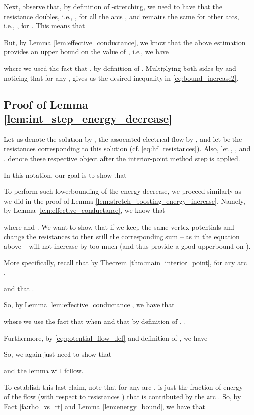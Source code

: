 \documentclass[11pt, letterpaper]{article}
\begin{document}
Next, observe that, by definition of -stretching, we need to have that the resistance doubles, i.e., , for all the arcs , and remains the same for other arcs, i.e., , for .  
This means that



But, by Lemma \ref{lem:effective_conductance}, we know that the above estimation provides an upper bound on the value of , i.e., we have

where we used the fact that , by definition of . Multiplying both sides by  and noticing that  for any , gives us the desired inequality in \eqref{eq:bound_increase2}. 

\subsection{Proof of Lemma \ref{lem:int_step_energy_decrease}}\label{app:int_step_energy_decrease}

Let us denote the solution  by , the associated electrical flow  by , and let  be the resistances  corresponding to this solution (cf. \eqref{eq:hf_resistances}). Also, let , , and , denote these respective object after the interior-point method step is applied. 

In this notation, our goal is to show that


 
To perform such lowerbounding of the energy decrease, we proceed similarly as we did in the proof of Lemma \ref{lem:stretch_boosting_energy_increase}. Namely, by Lemma \ref{lem:effective_conductance}, we know that 

where  and . We want to show that if we keep the same vertex potentials  and change the resistances to  then still the corresponding sum -- as in the equation above -- will not increase by too much (and thus provide a good upperbound on ). 

More specifically, recall that by Theorem \ref{thm:main_interior_point}, for any arc ,

and that . 

So, by Lemma \ref{lem:effective_conductance}, we have that


where we use the fact that  when  and that by definition of , .  

Furthermore, by \eqref{eq:potential_flow_def} and definition of , we have

So, we again just need to show that 

and the lemma will follow.

To establish this last claim, note that for any arc ,  is just the fraction of energy of the flow  (with respect to resistances ) that is contributed by the arc . So, by Fact \ref{fa:rho_vs_rt} and Lemma \ref{lem:energy_bound}, we have that 
\end{document}
